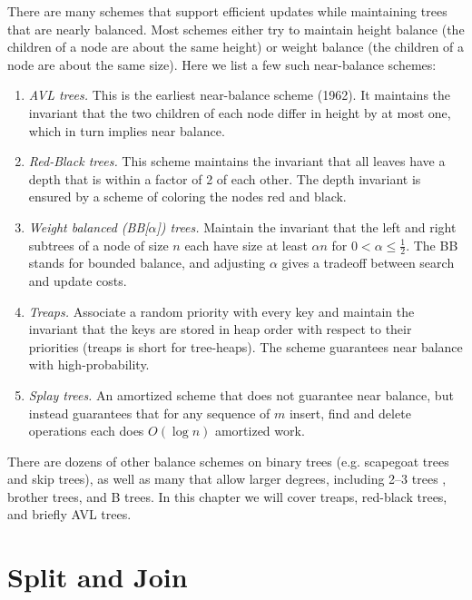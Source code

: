 There are many schemes that support efficient updates while
maintaining trees that are nearly balanced.  Most schemes either try
to maintain height balance (the children of a node are about the same
height) or weight balance (the children of a node are about the same
size).  Here we list a few such near-balance schemes:

\begin{enumerate}
\item \emph{AVL trees.}  This is the earliest near-balance scheme
  (1962).  It maintains the invariant that the two children of each
  node differ in height by at most one, which in turn implies near
  balance.
\item \emph{Red-Black trees.}  This scheme maintains the invariant
  that all leaves have a depth that is within a factor of 2 of each
  other.  The depth invariant is ensured by a scheme of coloring the
  nodes red and black.
\item \emph{Weight balanced (BB[$\alpha$]) trees.}  Maintain the
  invariant that the left and right subtrees of a node of size $n$
  each have size at least $\alpha n$ for $0 < \alpha \leq
  \frac{1}{2}$.  The BB stands for bounded balance, and adjusting $\alpha$ gives a tradeoff between search and update costs.
\item \emph{Treaps.}  Associate a random priority with every key and
  maintain the invariant that the keys are stored in heap order with
  respect to their priorities (treaps is short for tree-heaps).  The scheme
  guarantees near balance with high-probability.
\item \emph{Splay trees.}  An amortized scheme that does not guarantee
  near balance, but instead guarantees that for any sequence of $m$
  insert, find and delete operations each does $O(\log n)$ amortized
  work.
\end{enumerate}
There are dozens of other balance schemes on binary trees (e.g. scapegoat
trees and skip trees), as well as many that allow larger degrees,
including 2--3 trees , brother trees, and B trees.  In this chapter we
will cover treaps, red-black trees, and briefly AVL trees.

\section{Split and Join}

